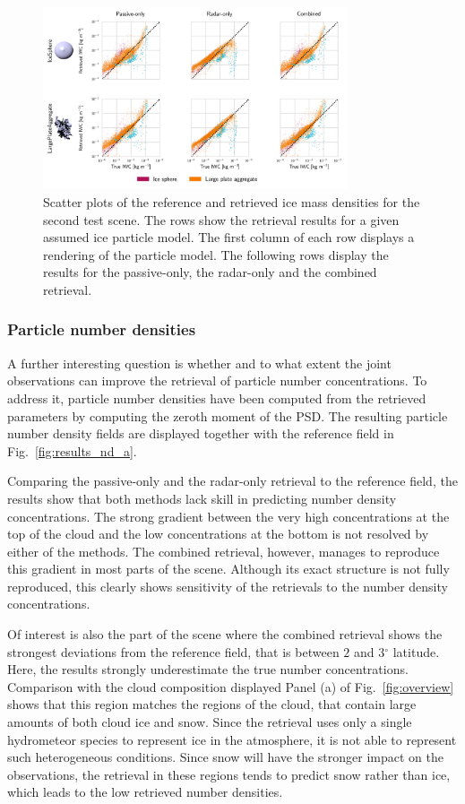 \documentclass[journal abbreviation, manuscript]{copernicus}
\begin{document}
\begin{figure}
\centering
\includegraphics[width = 0.8\textwidth]{../plots/results_scatter_b_1}
\caption{Scatter plots of the reference and retrieved ice mass densities for
  the second test scene. The rows show the retrieval results for a given
  assumed ice particle model. The first column of each row displays a rendering
  of the particle model. The following rows display the results for the
  passive-only, the radar-only and the combined retrieval.}
\label{fig:results_scatter_b_1}
\end{figure}


\subsubsection{Particle number densities}

A further interesting question is whether and to what extent the joint
observations can improve the retrieval of particle number concentrations.
To address it, particle number densities have been computed from the
retrieved parameters by computing the zeroth moment of the PSD. The resulting
particle number density fields are displayed together with the reference
field in Fig.~\ref{fig:results_nd_a}.

Comparing the passive-only and the radar-only retrieval to the reference
field, the results show that both methods lack skill in predicting number
density concentrations. The strong gradient between the very high concentrations
at the top of the cloud and the low concentrations at the bottom is not resolved
by either of the methods. The combined retrieval, however, manages to reproduce
this gradient in most parts of the scene. Although its exact structure
is not fully reproduced, this clearly shows sensitivity of the retrievals to
the number density concentrations.

Of interest is also the part of the scene where the combined retrieval shows
the strongest deviations from the reference field, that is between $2$ and
$3\unit{^\circ}$ latitude. Here, the results strongly underestimate the true
number concentrations. Comparison with the cloud composition displayed Panel (a)
of Fig.~\ref{fig:overview} shows that this region matches the regions of the
cloud, that contain large amounts of both cloud ice and snow. Since the
retrieval uses only a single hydrometeor species to represent ice in the
atmosphere, it is not able to represent such heterogeneous conditions. Since
snow will have the stronger impact on the observations, the retrieval in these
regions tends to predict snow rather than ice, which leads to the low retrieved
number densities.
\end{document}
